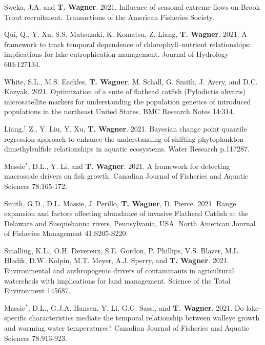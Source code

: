 \documentclass[10pt]{article}
\begin{document}
\begin{flushleft}
\begin{etaremune}[start=117]
\item Sweka, J.A. and \textbf{T. Wagner}. 2021. Influence of seasonal extreme flows on Brook Trout recruitment. Transactions of the American Fisheries Society.

\item Qui, Q., Y. Xu, S.S. Matsuzaki, K. Komatsu, Z. Liang, \textbf{T. Wagner}. 2021. A framework to track temporal dependence of chlorophyll–nutrient relationships: implications for lake eutrophication management. Journal of Hydrology 603:127134.

\item White, S.L., M.S. Eackles, \textbf{T. Wagner}, M. Schall, G. Smith, J. Avery, and D.C. Kazyak. 2021. Optimization of a suite of flathead catfish (Pylodictis olivaris) microsatellite markers for understanding the population genetics of introduced populations in the northeast United States. BMC Research Notes 14:314.

\item Liang,$^\dagger$ Z., Y. Liu, Y. Xu, \textbf{T. Wagner}. 2021. Bayesian change point quantile regression approach to enhance the understanding of shifting phytoplankton-dimethylsulfide relationships in aquatic ecosystems. Water Research p.117287.

\item Massie$^*$, D.L.,  Y. Li, and \textbf{T. Wagner}. 2021. A framework for detecting macroscale drivers on fish growth.  Canadian Journal of Fisheries and Aquatic Sciences 78:165-172.

\item Smith, G.D., D.L. Massie, J. Perillo, \textbf{T. Wagner}, D. Pierce. 2021. Range expansion and factors affecting abundance of invasive Flathead Catfish at the Delaware and Susquehanna rivers, Pennsylvania, USA. North American Journal of Fisheries Management 41:S205-S220. 

\item Smalling, K.L., O.H. Devereux, S.E. Gordon, P. Phillips, V.S. Blazer, M.L. Hladik, D.W. Kolpin, M.T. Meyer, A.J. Sperry, and \textbf{T. Wagner}. 2021. Environmental and anthropogenic drivers of contaminants in agricultural watersheds with implications for land management.  Science of the Total Environment 145687.

\item Massie$^*$, D.L., G.J.A. Hansen, Y. Li, G.G. Sass., and \textbf{T. Wagner}. 2021. Do lake-specific characteristics mediate the temporal relationship between walleye growth and warming water temperatures? Canadian Journal of Fisheries and Aquatic Sciences 78:913-923.


\end{etaremune}
\end{flushleft}
\end{document}
